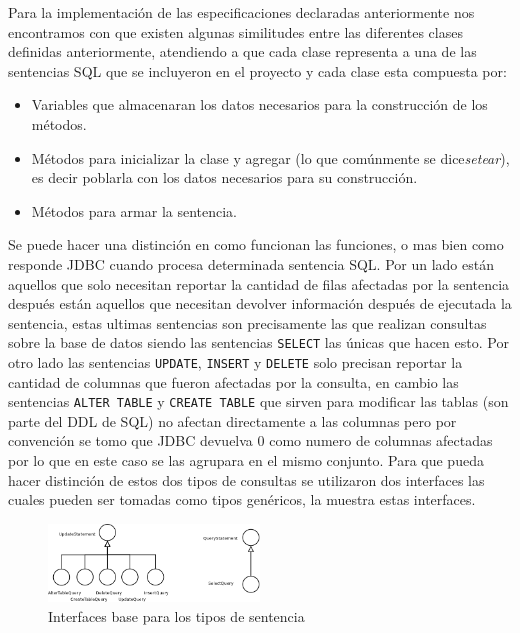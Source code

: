 Para la implementación de las especificaciones declaradas anteriormente nos encontramos con que existen algunas similitudes entre las diferentes clases definidas anteriormente, atendiendo a que cada clase representa a una de las sentencias SQL que se incluyeron en el proyecto y cada clase esta compuesta por:
\begin{itemize}
\item Variables que almacenaran los datos necesarios para la construcción de los métodos.

\item Métodos para inicializar la clase y agregar (lo que comúnmente se dice\textit{setear}), es decir poblarla con los datos necesarios para su construcción.

\item Métodos para armar la sentencia.

\end{itemize}
Se puede hacer una distinción en como funcionan las funciones, o mas bien como responde JDBC cuando procesa determinada sentencia SQL. Por un lado están aquellos que solo necesitan reportar la cantidad de filas afectadas por la sentencia después están aquellos que necesitan devolver información después de ejecutada la sentencia, estas ultimas sentencias son precisamente las que realizan consultas sobre la base de datos siendo las sentencias \verb=SELECT= las únicas que hacen esto. Por otro lado las sentencias \verb=UPDATE=, \verb=INSERT= y \verb=DELETE= solo precisan reportar la cantidad de columnas que fueron afectadas por la consulta, en cambio las sentencias \verb=ALTER TABLE= y \verb=CREATE TABLE= que sirven para modificar las tablas (son parte del DDL de SQL) no afectan directamente a las columnas pero por convención se tomo que JDBC devuelva 0 como numero de columnas afectadas por lo que en este caso se las agrupara en el mismo conjunto. Para que \jj pueda hacer distinción de estos dos tipos de consultas se utilizaron dos interfaces las cuales pueden ser tomadas como tipos genéricos, la  muestra estas interfaces.\\

\begin{figure}
  \centering
    \includegraphics[width=0.5\textwidth]{figuras/crossdb-base.png}
  \caption{Interfaces base para los tipos de sentencia}
  \label{fig:crossdb-base}
\end{figure}


